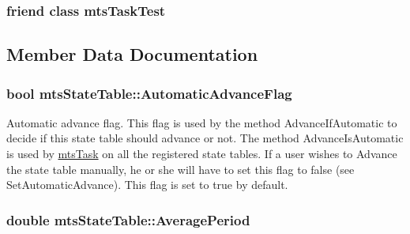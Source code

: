 \hypertarget{classmts_state_table_a6cdb4e8009fd76a9cf7e4e42b4bd0b8d}{
\subsubsection[{mts\-Task\-Test}]{\setlength{\rightskip}{0pt plus 5cm}friend class mts\-Task\-Test\hspace{0.3cm}{\ttfamily [friend]}}}\label{classmts_state_table_a6cdb4e8009fd76a9cf7e4e42b4bd0b8d}


\subsection{Member Data Documentation}
\hypertarget{classmts_state_table_acbe22d62ae7c8190c92059bc50da941d}{
\subsubsection[{Automatic\-Advance\-Flag}]{\setlength{\rightskip}{0pt plus 5cm}bool mts\-State\-Table\-::\-Automatic\-Advance\-Flag\hspace{0.3cm}{\ttfamily [protected]}}}\label{classmts_state_table_acbe22d62ae7c8190c92059bc50da941d}
Automatic advance flag. This flag is used by the method Advance\-If\-Automatic to decide if this state table should advance or not. The method Advance\-Is\-Automatic is used by \hyperlink{classmts_task}{mts\-Task} on all the registered state tables. If a user wishes to Advance the state table manually, he or she will have to set this flag to false (see Set\-Automatic\-Advance). This flag is set to true by default. \hypertarget{classmts_state_table_a5005978e1547af1b2b864fa366585468}{
\subsubsection[{Average\-Period}]{\setlength{\rightskip}{0pt plus 5cm}double mts\-State\-Table\-::\-Average\-Period\hspace{0.3cm}{\ttfamily [protected]}}}\label{classmts_state_table_a5005978e1547af1b2b864fa366585468}
